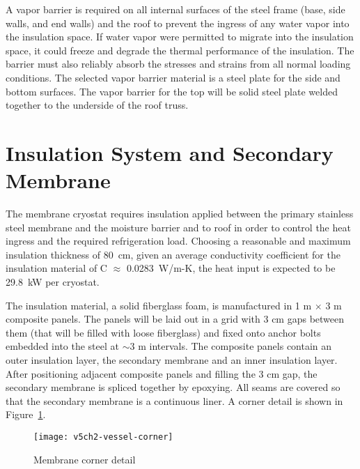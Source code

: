 A vapor barrier is required on all internal surfaces of the 
steel frame (base, side walls, and end walls) and the roof to 
prevent the ingress of any water vapor into the insulation 
space. If water vapor were permitted to migrate into the 
insulation space, it could freeze and degrade the thermal 
performance of the insulation. The barrier must also 
reliably absorb the stresses and strains from all normal 
loading conditions. The selected vapor barrier material 
is a steel plate for the side and bottom surfaces. 
The vapor barrier for the top will be solid steel plate 
welded together to the underside of the roof truss.


\section{Insulation System and Secondary Membrane}
\label{subsec:insul-2nd-mem}

The membrane cryostat requires insulation applied between the primary stainless steel membrane and the moisture barrier and to roof in order to control the heat 
ingress and the required 
refrigeration load. Choosing a reasonable and maximum insulation 
thickness of 80~cm, given an average conductivity coefficient 
for the insulation material of C $\approx$ 0.0283~W/m-K, the 
heat input is expected to be 29.8~kW 
per cryostat. %



The insulation material, a solid fiberglass foam, is manufactured in 1 m 
$\times$ 3 m composite panels. The panels will be laid out in a grid with 
3 cm gaps between them (that will be filled with loose fiberglass) and 
fixed onto anchor bolts embedded into the steel at $\sim$3 m intervals. 
The composite panels contain an outer insulation layer, the secondary 
membrane and an inner insulation layer. After positioning adjacent 
composite panels and filling the 3 cm gap, the secondary membrane 
is spliced together by epoxying. All seams are covered so that the secondary
membrane is a continuous liner. A corner detail is shown 
in Figure~\ref{fig:vessel-corner}.


\begin{figure}[htbp]
\centering
\texttt{[image: v5ch2-vessel-corner]}
\caption{Membrane corner detail}
\label{fig:vessel-corner} %
\end{figure}

